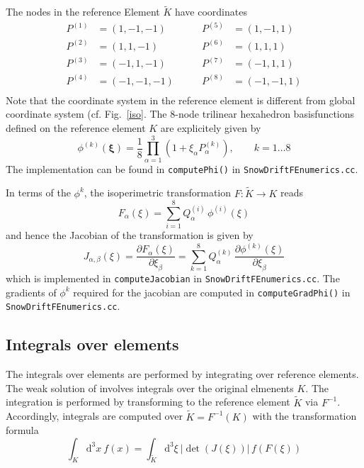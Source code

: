 \documentclass[12pt]{report}
\begin{document}
The nodes in the reference Element $\tilde{K}$ have coordinates
\begin{align}
  {P}^{(1)}&=(1,-1,-1)&\qquad{P}^{(5)}&=(1,-1,1) \\\nonumber
  {P}^{(2)}&=(1, 1,-1)&\qquad{P}^{(6)}&=(1,1,1)\\\nonumber
  {P}^{(3)}&=(-1,1,-1)&\qquad{P}^{(7)}&=(-1,1,1)\\\nonumber
  {P}^{(4)}&=(-1,-1,-1)&\qquad{P}^{(8)}&=(-1,-1,1)\\\nonumber
\end{align}
Note that the coordinate system in the reference element is different
from global coordinate system (cf. Fig.\ \ref{iso}. The 8-node
trilinear hexahedron basisfunctions defined on the reference element
$K$ are explicitely given by
\begin{equation}
  \phi^{(k)}(\mathbf{\xi}) =\frac{1}{8}\prod_{\alpha=1}^3
  (1+\xi_{\alpha}P^{(k)}_{\alpha}),\qquad k=1\ldots 8
\end{equation}
The implementation can be found in \verb+computePhi()+ in
\verb+SnowDriftFEnumerics.cc+. 

In terms of the $\phi^k$, the isoperimetric transformation
$F:\tilde{K}\to K$ reads
\begin{equation}\label{isoperimetric}
  F_{\alpha}(\xi) = \sum_{i=1}^8 Q_{\alpha}^{(i)}\, \phi^{(i)}(\xi)
\end{equation}
and hence the Jacobian of the transformation is given by
\begin{equation}
  J_{\alpha,\beta}(\xi) 
  = \frac{\partial F_{\alpha}(\xi)}{\partial \xi_{\beta}}
  = \sum_{k=1}^8 Q_{\alpha}^{(k)}\, \frac{\partial \phi^{(k)}(\xi)}{\partial \xi_{\beta}}
\end{equation}
which is implemented in \verb+computeJacobian+ in
\verb+SnowDriftFEnumerics.cc+. The gradients of $\phi^k$ required for
the jacobian are computed in \verb+computeGradPhi()+ in
\verb+SnowDriftFEnumerics.cc+.


\subsection{Integrals over elements}
The integrals over elements are performed by integrating over
reference elements. The weak solution of involves integrals over the
original elmenents $K$. The integration is performed by transforming
to the reference element $\tilde{K}$ via $F^{-1}$. Accordingly,
integrals are computed over $\tilde{K}=F^{-1}(K)$ with the
transformation formula
\begin{equation}
  \int_K \mathrm{d}^3 x\: f(x) 
  = \int_{\tilde{K}} \mathrm{d}^3 \xi\: 
  |\det( J(\xi) )|\,f(F(\xi))
\end{equation}
\end{document}

